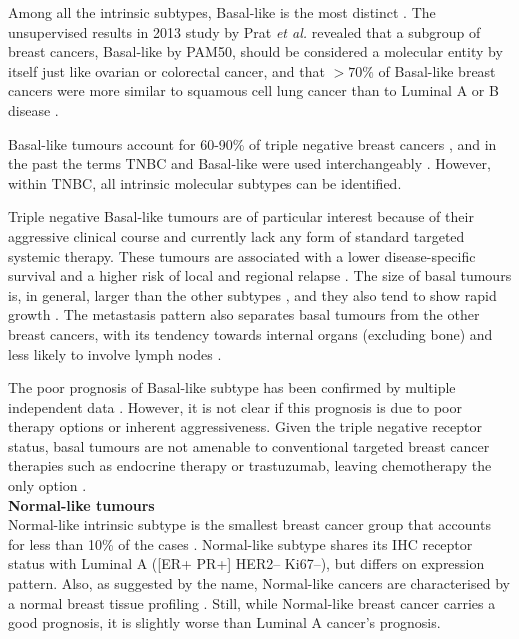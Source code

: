 Among all the intrinsic subtypes, Basal-like is the most distinct \cite{TCGAResearchNetwork2012}. The unsupervised results in 2013 study by Prat \textit{et al.} \cite{prat2013genomic}  revealed that a subgroup of breast cancers, Basal-like by PAM50, should be considered a molecular entity by itself just like ovarian or colorectal cancer, and that $>70\%$ of Basal-like breast cancers were more similar to squamous cell lung cancer than to Luminal A or B disease \cite{prat2013genomic}. 

Basal-like tumours account for 60-90\% of triple negative breast cancers \cite{fan2006concordance}, and in the past the terms TNBC and Basal-like were used interchangeably \cite{Vidal2017}. However, within TNBC, all intrinsic molecular subtypes can be identified. 

Triple negative Basal-like tumours are of particular interest because of their aggressive clinical course and currently lack any form of standard targeted systemic therapy. These tumours are associated with a lower disease-specific survival and a higher risk of local and regional relapse \cite{hudis2011triple}. 
The size of basal tumours is, in general, larger than the other subtypes \cite{rakha2006morphological}, and they also tend to show rapid growth \cite{ho2012characterization}. The metastasis pattern also separates basal tumours from the other breast cancers, with its tendency towards internal organs (excluding bone) and less likely to involve lymph nodes \cite{ho2012characterization}. 

The poor prognosis of Basal-like subtype  has been confirmed by multiple independent data \cite{brenton2005molecular}. However, it is not clear if this prognosis is due to poor therapy options or inherent aggressiveness. Given the triple negative receptor status,  basal tumours are not amenable to conventional targeted breast cancer therapies such as endocrine therapy or trastuzumab, leaving chemotherapy the only option \cite{brenton2005molecular, Dai2015}. \\


\textbf{Normal-like tumours }\\
Normal-like intrinsic subtype is the smallest breast cancer group that accounts for less than 10\% of the cases \cite{Dai2015}. Normal-like subtype shares its IHC receptor status with Luminal A ([ER+ PR+] HER2-- Ki67--), but differs on expression pattern. Also, as suggested by the name, Normal-like cancers are characterised by a normal breast tissue profiling \cite{perou2000molecular}. Still, while Normal-like breast cancer carries a good prognosis, it is slightly worse than Luminal A cancer’s prognosis.\\




























